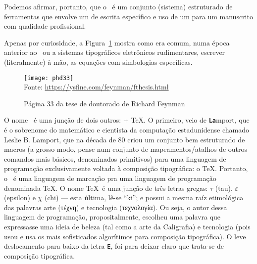 \begin{center}
  \begin{PostItNote}[Render=tikz, Color=douradoUFRB]
    \sffamily
    Podemos afirmar, portanto, que o \latex\ é um conjunto (sistema) estruturado 
    de ferramentas que envolve um  de escrita específico e uso 
    de um  para  um manuscrito 
    com qualidade profissional. 
  \end{PostItNote}
\end{center}

Apenas por curiosidade, a Figura~\ref{fig:phd} mostra como era comum, numa época 
anterior ao \latex\ ou a sistemas tipográficos eletrônicos rudimentares, escrever 
(literalmente) \textsf{à mão}, as equações com simbologias específicas. 

\begin{figure}[!htbp]
  \centering
  \caption{Página 33 da tese de doutorado de Richard Feynman}
  \label{fig:phd}
  \texttt{[image: phd33]} \\
  {
  \small \sffamily
  \textsf{Fonte:} \href{https://ysfine.com/feynman/fthesis.html}{https://ysfine.com/feynman/fthesis.html}
}
\end{figure}

O nome \latex\ é uma junção de dois outros:  + \TeX. 
O primeiro, veio de \texttt{\textbf{La}}mport, que é o sobrenome do matemático e 
cientista da computação  estadunidense chamado \textsf{Leslie B. Lamport}, que 
na década de 80 criou um conjunto bem estruturado de \textsf{macros} (a grosso 
modo, pense num conjunto de mapeamentos/atalhos de outros comandos mais básicos, 
denominados \textsf{primitivos}) para uma linguagem de programação exclusivamente 
voltada à composição tipográfica: o \TeX. 
Portanto, o \latex\ é uma linguagem de \textsf{marcação} pra uma linguagem de 
\textsf{programação} denominada \TeX. 
O nome \TeX\ é uma junção de três letras gregas: $\tau$ (\textsf{tau}), 
$\varepsilon$ (\textsf{epsilon}) e $\chi$ (\textsf{chi}) --- esta última, lê-se 
``ki''; e possui a mesma raíz etimológica das palavras \textsf{arte} ({\grega τέχνη}) 
e \textsf{tecnologia} ({\grega τεχνολογία}). 
Ou seja, o autor dessa linguagem de programação, propositalmente, escolheu uma 
palavra que expressasse uma ideia de beleza (tal como a arte da {\caligra \Large Caligrafia})
e tecnologia (pois usou e usa os mais sofisticados algorítimos para composição 
tipográfica).
O leve deslocamento para baixo da letra \texttt{E}, foi para deixar claro que 
trata-se de composição tipográfica. 

